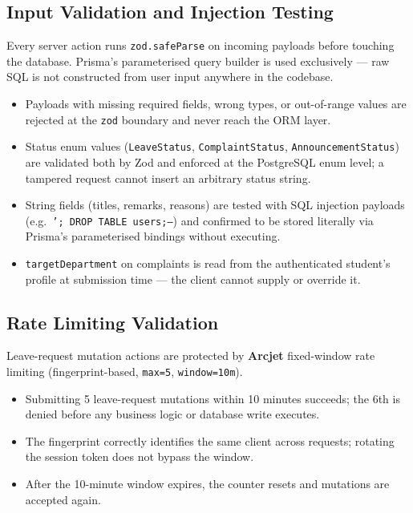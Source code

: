 \subsection{Input Validation and Injection Testing}

Every server action runs \texttt{zod.safeParse} on incoming payloads before touching the
database. Prisma's parameterised query builder is used exclusively — raw SQL is not
constructed from user input anywhere in the codebase.

\begin{itemize}
    \item Payloads with missing required fields, wrong types, or out-of-range values are
          rejected at the \texttt{zod} boundary and never reach the ORM layer.
    \item Status enum values (\texttt{LeaveStatus}, \texttt{ComplaintStatus},
          \texttt{AnnouncementStatus}) are validated both by Zod and enforced at the
          PostgreSQL enum level; a tampered request cannot insert an arbitrary status string.
    \item String fields (titles, remarks, reasons) are tested with SQL injection payloads
          (e.g.\ \texttt{'; DROP TABLE users;--}) and confirmed to be stored literally via
          Prisma's parameterised bindings without executing.
    \item \texttt{targetDepartment} on complaints is read from the authenticated student's
          profile at submission time — the client cannot supply or override it.
\end{itemize}

\subsection{Rate Limiting Validation}

Leave-request mutation actions are protected by \textbf{Arcjet} fixed-window rate limiting
(fingerprint-based, \texttt{max=5}, \texttt{window=10m}).

\begin{itemize}
    \item Submitting 5 leave-request mutations within 10 minutes succeeds; the 6th is
          denied before any business logic or database write executes.
    \item The fingerprint correctly identifies the same client across requests; rotating
          the session token does not bypass the window.
    \item After the 10-minute window expires, the counter resets and mutations are
          accepted again.
\end{itemize}

